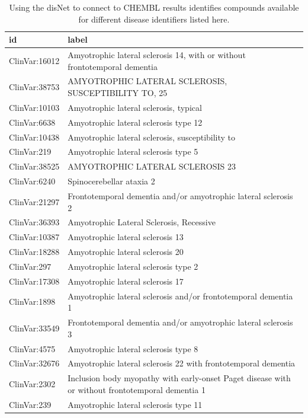 \documentclass[9pt,a4paper,]{extarticle}
\begin{document}
\begin{table}

\caption{\label{tab:clinvarDisNetind}Using the disNet to connect to CHEMBL results identifies compounds available for different disease identifiers listed here.}
\centering
\begin{tabular}[t]{l|l}
\hline
id & label\\
\hline
ClinVar:16012 & Amyotrophic lateral sclerosis 14, with or without frontotemporal dementia\\
\hline
ClinVar:38753 & AMYOTROPHIC LATERAL SCLEROSIS, SUSCEPTIBILITY TO, 25\\
\hline
ClinVar:10103 & Amyotrophic lateral sclerosis, typical\\
\hline
ClinVar:6638 & Amyotrophic lateral sclerosis type 12\\
\hline
ClinVar:10438 & Amyotrophic lateral sclerosis, susceptibility to\\
\hline
ClinVar:219 & Amyotrophic lateral sclerosis type 5\\
\hline
ClinVar:38525 & AMYOTROPHIC LATERAL SCLEROSIS 23\\
\hline
ClinVar:6240 & Spinocerebellar ataxia 2\\
\hline
ClinVar:21297 & Frontotemporal dementia and/or amyotrophic lateral sclerosis 2\\
\hline
ClinVar:36393 & Amyotrophic Lateral Sclerosis, Recessive\\
\hline
ClinVar:10387 & Amyotrophic lateral sclerosis 13\\
\hline
ClinVar:18288 & Amyotrophic lateral sclerosis 20\\
\hline
ClinVar:297 & Amyotrophic lateral sclerosis type 2\\
\hline
ClinVar:17308 & Amyotrophic lateral sclerosis 17\\
\hline
ClinVar:1898 & Amyotrophic lateral sclerosis and/or frontotemporal dementia 1\\
\hline
ClinVar:33549 & Frontotemporal dementia and/or amyotrophic lateral sclerosis 3\\
\hline
ClinVar:4575 & Amyotrophic lateral sclerosis type 8\\
\hline
ClinVar:32676 & Amyotrophic lateral sclerosis 22 with frontotemporal dementia\\
\hline
ClinVar:2302 & Inclusion body myopathy with early-onset Paget disease with or without frontotemporal dementia 1\\
\hline
ClinVar:239 & Amyotrophic lateral sclerosis type 11\\

\end{tabular}
\end{table}
\end{document}
